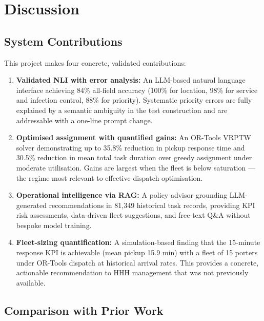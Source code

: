 \documentclass[12pt,a4paper]{article}
\begin{document}
\section{Discussion}

\subsection{System Contributions}

This project makes four concrete, validated contributions:

\begin{enumerate}
  \item \textbf{Validated NLI with error analysis:} An LLM-based natural language interface achieving 84\% all-field accuracy (100\% for location, 98\% for service and infection control, 88\% for priority). Systematic priority errors are fully explained by a semantic ambiguity in the test construction and are addressable with a one-line prompt change.

  \item \textbf{Optimised assignment with quantified gains:} An OR-Tools VRPTW solver demonstrating up to 35.8\% reduction in pickup response time and 30.5\% reduction in mean total task duration over greedy assignment under moderate utilisation. Gains are largest when the fleet is below saturation --- the regime most relevant to effective dispatch optimisation.

  \item \textbf{Operational intelligence via RAG:} A policy advisor grounding LLM-generated recommendations in 81,349 historical task records, providing KPI risk assessments, data-driven fleet suggestions, and free-text Q\&A without bespoke model training.

  \item \textbf{Fleet-sizing quantification:} A simulation-based finding that the 15-minute response KPI is achievable (mean pickup 15.9 min) with a fleet of 15 porters under OR-Tools dispatch at historical arrival rates. This provides a concrete, actionable recommendation to HHH management that was not previously available.
\end{enumerate}

\subsection{Comparison with Prior Work}
\end{document}
